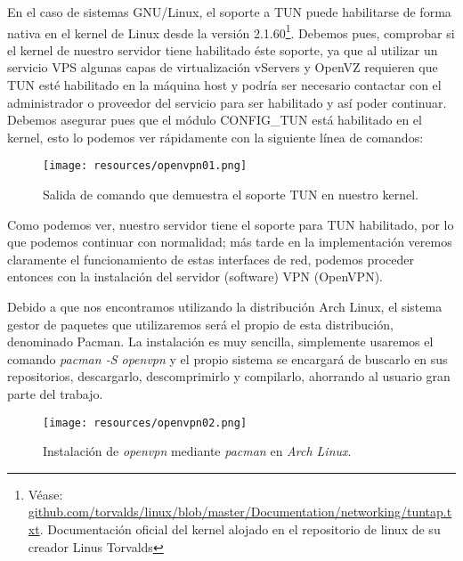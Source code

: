 \documentclass[a4paper, 11pt, titlepage]{article}
\begin{document}
        En el caso de sistemas GNU/Linux, el soporte a TUN puede habilitarse de forma nativa en el kernel de Linux desde la versión 2.1.60\footnote{Véase:
        \href{https://github.com/torvalds/linux/blob/master/Documentation/networking/tuntap.txt}{github.com/torvalds/linux/blob/master/Documentation/networking/tuntap.txt}.
        Documentación oficial del kernel alojado en el repositorio de linux de su creador Linus Torvalds}. Debemos pues, comprobar si el kernel de nuestro
        servidor tiene habilitado éste soporte, ya que al utilizar un servicio VPS algunas capas de virtualización vServers y OpenVZ requieren que TUN
        esté habilitado en la máquina host y podría ser necesario contactar con el administrador o proveedor del servicio para ser habilitado y así poder 
        continuar. Debemos asegurar pues que el módulo CONFIG\_TUN está habilitado en el kernel, esto lo podemos ver rápidamente con la siguiente línea de 
        comandos:
        
        \begin{figure}[htp]
            \centering
            \texttt{[image: resources/openvpn01.png]}
            \caption{Salida de comando que demuestra el soporte TUN en nuestro kernel.}
            \label{tuntap02}
        \end{figure}
        
        Como podemos ver, nuestro servidor tiene el soporte para TUN habilitado, por lo que podemos continuar con normalidad; más tarde en la implementación
        veremos claramente el funcionamiento de estas interfaces de red, podemos proceder entonces con la instalación del servidor (software) VPN (OpenVPN).
    
        Debido a que nos encontramos utilizando la distribución Arch Linux, el sistema gestor de paquetes que utilizaremos será el propio de esta distribución, 
        denominado Pacman. La instalación es muy sencilla, simplemente usaremos el comando \textit{pacman -S openvpn} y el propio sistema se encargará de buscarlo
        en sus repositorios, descargarlo, descomprimirlo y compilarlo, ahorrando al usuario gran parte del trabajo.
        
        \begin{figure}[htp]
            \centering
            \texttt{[image: resources/openvpn02.png]}
            \caption{Instalación de \textit{openvpn} mediante \textit{pacman} en \textit{Arch Linux}.}
            \label{tuntap02}
        \end{figure}
        
\end{document}
